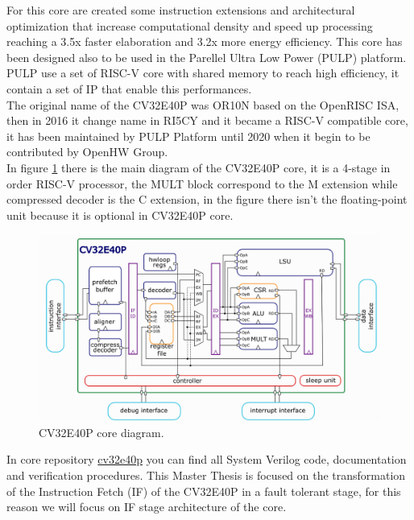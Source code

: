 {{		
		For this core are created some instruction extensions and architectural optimization that increase computational density and speed up processing reaching a 3.5x faster elaboration and 3.2x more energy efficiency. 
		This core has been designed also to be used in the Parellel Ultra Low Power (PULP) platform. PULP use a set of RISC-V core with shared memory to reach high efficiency, it contain a set of IP that enable this performances.\\
		
		
		The original name of the CV32E40P was OR10N based on the OpenRISC ISA, then in 2016 it change name in RI5CY and it became a RISC-V compatible core, it has been maintained by PULP Platform until 2020 when it begin to be contributed by OpenHW Group.\\
		
		In figure \ref{fig:cv32e40p_core_diagram} there is the main diagram of the CV32E40P core, it is a 4-stage in order RISC-V processor, the MULT block correspond to the M extension while compressed decoder is the C extension, in the figure there isn't the floating-point unit because it is optional in CV32E40P core.
		
	    \begin{figure}[H]
			\centering
			\includegraphics[scale=0.3,center]{./images/CV32E40P_core_diagram.png}
			\caption{CV32E40P core diagram.}
			\label{fig:cv32e40p_core_diagram}
		\end{figure}  
		
		In core repository \href{https://github.com/openhwgroup/cv32e40p}{cv32e40p} you can find all System Verilog code, documentation and verification procedures.
		This Master Thesis is focused on the transformation of the Instruction Fetch (IF) of the CV32E40P in a fault tolerant stage, for this reason we will focus on IF stage architecture of the core.
		
}}
